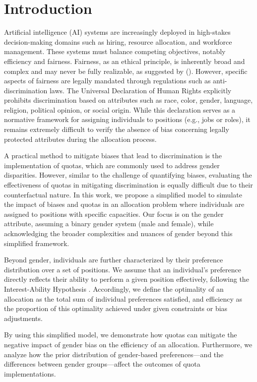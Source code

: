 \documentclass[letterpaper]{article}
\newcommand{\citet}[1]{\citeauthor{#1} (\citeyear{#1})}
\begin{document}
\section{Introduction}
Artificial intelligence (AI) systems are increasingly deployed in high-stakes decision-making domains such as hiring, resource allocation, and workforce management. These systems must balance competing objectives, notably efficiency and fairness. Fairness, as an ethical principle, is inherently broad and complex and may never be fully realizable, as suggested by \citet{Peterson_Hamrouni_2022}. However, specific aspects of fairness are legally mandated through regulations such as anti-discrimination laws. The Universal Declaration of Human Rights \cite{udhr1948} explicitly prohibits discrimination based on attributes such as race, color, gender, language, religion, political opinion, or social origin. While this declaration serves as a normative framework for assigning individuals to positions (e.g., jobs or roles), it remains extremely difficult to verify the absence of bias concerning legally protected attributes during the allocation process.

A practical method to mitigate biases that lead to discrimination is the implementation of quotas, which are commonly used to address gender disparities. However, similar to the challenge of quantifying biases, evaluating the effectiveness of quotas in mitigating discrimination is equally difficult due to their counterfactual nature. In this work, we propose a simplified model to simulate the impact of biases and quotas in an allocation problem where individuals are assigned to positions with specific capacities. Our focus is on the gender attribute, assuming a binary gender system (male and female), while acknowledging the broader complexities and nuances of gender beyond this simplified framework.

Beyond gender, individuals are further characterized by their preference distribution over a set of positions. We assume that an individual's preference directly reflects their ability to perform a given position effectively, following the Interest-Ability Hypothesis \cite{jintelligence10030043}. Accordingly, we define the optimality of an allocation as the total sum of individual preferences satisfied, and efficiency as the proportion of this optimality achieved under given constraints or bias adjustments.

By using this simplified model, we demonstrate how quotas can mitigate the negative impact of gender bias on the efficiency of an allocation. Furthermore, we analyze how the prior distribution of gender-based preferences—and the differences between gender groups—affect the outcomes of quota implementations.
\end{document}
